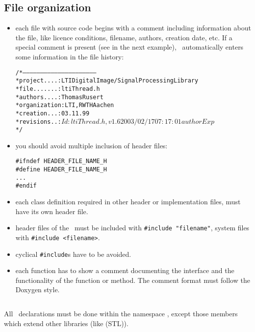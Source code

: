 \subsection{File organization}

\newcommand{\thelog}{Id}

\begin{itemize}
\item each file with source code begins with a comment including information
  about the file, like licence conditions, filename, authors, creation date,
  etc.  If a special comment is present (see \code{\$\thelog} in the next
  example), \cvs\ automatically enters some information in the file history:

{\small
\begin{alltt}
/*--------------------------------------------------------------
 * project ....: LTI Digital Image/Signal Processing Library
 * file .......: ltiThread.h
 * authors ....: Thomas Rusert
 * organization: LTI, RWTH Aachen
 * creation ...: 03.11.99
 * revisions ..: $\thelog: ltiThread.h,v 1.6 2003/02/17 07:17:01 author Exp $
 */
\end{alltt}
}

\item you should avoid multiple inclusion of header files:
\begin{verbatim}
#ifndef HEADER_FILE_NAME_H
#define HEADER_FILE_NAME_H
...
#endif
\end{verbatim}

\item each class definition required in other header or implementation files,
  must have its own header file.
\item header files of the \ltilib\ must be included with
  \verb+#include "filename"+, system files with
  \verb+#include <filename>+.
\item cyclical \verb+#include+s have to be avoided.
\item each function has to show a comment documenting the interface and the
  functionality of the function or method.  The comment format must follow the
  Doxygen style.
\end{itemize}

\subsection{}
All \ltilib\ declarations must be done within the namespace
 , except those members which extend other
libraries (like \stl (STL)).

